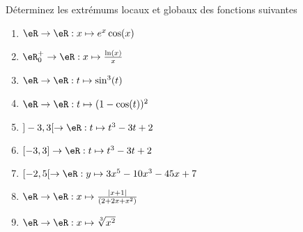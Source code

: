 
\begin{exercice}\label{exoOptimSS0001}

Déterminez les extrémums locaux et globaux des fonctions suivantes


\begin{multicols}{2}

\begin{enumerate}
\item $ \eR \rightarrow \eR : x \mapsto e^x \cos(x)$
\item $ \eR_0^+ \rightarrow \eR : x \mapsto \frac{\ln(x)}{x} $
\item $ \eR \rightarrow \eR : t \mapsto \sin^3(t) $
\item $ \eR \rightarrow  \eR : t \mapsto (1 -\cos(t))^2 $
\item $ ]-3,3[ \rightarrow \eR : t \mapsto t^3-3t+2 $
\item $ [-3,3] \rightarrow \eR : t \mapsto t^3-3t+2 $
\item $ [-2,5[ \rightarrow \eR : y \mapsto 3x^5 - 10x^3 - 45 x + 7 $
\item $ \eR \rightarrow \eR : x \mapsto \frac{|x+1|}{(2 + 2x +x^2)} $
\item $ \eR \rightarrow \eR : x \mapsto \sqrt[3]{x^2} $
\end{enumerate}
\end{multicols}


\end{exercice}
